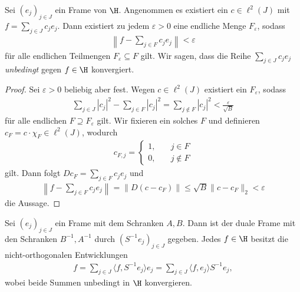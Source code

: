 \begin{lem}
	Sei $ (e_j)_{j \in J} $ ein Frame von $ \H $.
	Angenommen es existiert ein $ c \in \ell^2(J) $ mit $ f = \sum_{j \in J} c_j e_j $.
	Dann existiert zu jedem $ \varepsilon > 0  $ eine endliche Menge $ F_\varepsilon $, sodass 
	\begin{align*}
	\left\| f - \sum \limits_{j \in F} c_j e_j \right\| < \varepsilon
	\end{align*}
	für alle endlichen Teilmengen $  F_\varepsilon \subseteq F $ gilt.
	Wir sagen, dass die Reihe $ \sum_{j \in J} c_j e_j $ \textit{unbedingt} gegen $ f \in \H $ konvergiert.	
\end{lem}

\begin{proof}
	Sei $  \varepsilon > 0  $ beliebig aber fest. Wegen $ c \in \ell^2(J) $ existiert ein $ F_\varepsilon $, sodass 
	\begin{align*}
	\sum \limits_{j \in J} |c_j|^2 - \sum \limits_{j \in F} |c_j|^2 
	=
	\sum \limits_{j \notin F} |c_j|^2 < \frac{\varepsilon}{\sqrt{B}}
	\end{align*}
	für alle endlichen $ F \supseteq F_\varepsilon $ gilt. Wir fixieren ein solches $ F $ und definieren $ c_F = c \cdot \chi_F \in \ell^2(J) $, wodurch
	\begin{align*}
	c_{F,j} =
	\begin{cases}
	1 , &\quad j \in F\\
	0 , &\quad j \notin F
	\end{cases}
	\end{align*}
	gilt. Dann folgt $ D c_F = \sum \limits_{j \in F} c_j e_j $ und
	\begin{align*}
	\left\| f - \sum \limits_{j \in F} c_j e_j \right\|
	=
	\| D ( c- c_F) \|
	\leq 
	 \sqrt{B} \| c - c_F \|_2 < \varepsilon
	\end{align*}
	die Aussage.
\end{proof}

\begin{lem}
	Sei $ (e_j)_{j \in J} $ ein Frame mit dem Schranken $ A,B $. Dann ist der duale Frame mit den Schranken $ B^{-1}, A^{-1} $ durch $ (S^{-1} e_j)_{j \in J} $ gegeben.
	Jedes $ f \in \H $ besitzt die nicht-orthogonalen Entwicklungen
	\begin{align}\label{eq:frames_non_orthogonal_expansion}
	f = 
	\sum \limits_{j \in J} \langle f , S^{-1} e_j \rangle e_j
	=
	\sum \limits_{j \in J} \langle f , e_j \rangle   S^{-1} e_j,
	\end{align}
	wobei beide Summen unbedingt in $ \H $ konvergieren.
\end{lem}


